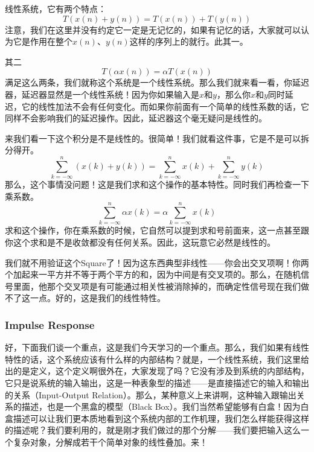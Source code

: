 \documentclass[a4paper,12pt]{article}
\begin{document}
线性系统，它有两个特点：
\begin{equation}
    T(x(n)+y(n)) = T(x(n)) + T(y(n))
\end{equation}
注意，我们在这里并没有约定它一定是无记忆的，如果有记忆的话，大家就可以认为它是作用在整个$x(n)$、$y(n)$这样的序列上的就行。此其一。

其二
\begin{equation}
    T(\alpha x(n)) = \alpha T(x(n))
\end{equation}
满足这么两条，我们就称这个系统是一个线性系统。那么我们就来看一看，你延迟器，延迟器显然是一个线性系统！因为你如果输入是$x$和$y$，那么你$x$和$y$同时延迟，它的线性加法不会有任何变化。而如果你前面有一个简单的线性系数的话，它同样不会影响我们的延迟操作。因此，延迟器这个毫无疑问是线性的。

来我们看一下这个积分是不是线性的。很简单！我们就看这件事，它是不是可以拆分得开。
\begin{equation}
    \sum^{n}_{k=-\infty} \left ( x(k)+y(k) \right ) = \sum^{n}_{k=-\infty}  x(k) + \sum^{n}_{k=-\infty} y(k) 
\end{equation}
那么，这个事情没问题！这是我们求和这个操作的基本特性。同时我们再检查一下乘系数。
\begin{equation}
    \sum^{n}_{k=-\infty} \alpha x(k)= \alpha \sum^{n}_{k=-\infty}  x(k)
\end{equation}
求和这个操作，你在乘系数的时候，它自然可以提到求和号前面来，这一点甚至跟你这个求和是不是收敛都没有任何关系。因此，这玩意它必然是线性的。

我们就不用验证这个Square了！因为这东西典型非线性——你会出交叉项啊！你两个加起来一平方并不等于两个平方的和，因为中间是有交叉项的。那么，在随机信号里面，他那个交叉项是有可能通过相关性被消除掉的，而确定性信号现在我们做不了这一点。好的，这是我们的线性特性。


\subsubsection{Impulse Response}\quad

好，下面我们谈一个重点，这是我们今天学习的一个重点。那么，我们如果有线性特性的话，这个系统应该有什么样的内部结构？就是，一个线性系统，我们这里给出的是定义，这个定义啊很外在，大家发现了吗？它没有涉及到系统的内部结构，它只是说系统的输入输出，这是一种表象型的描述——是直接描述它的输入和输出的关系（Input-Output Relation）。那么，某种意义上来讲啊，这种输入跟输出关系的描述，也是一个黑盒的模型（Black Box）。我们当然希望能够有白盒！因为白盒描述可以让我们更本质地看到这个系统内部的工作机理，我们怎么样能获得这样的描述呢？我们要利用的，就是刚才我们做过的那个分解——我们要把输入这么一个复杂对象，分解成若干个简单对象的线性叠加。来！
\end{document}
